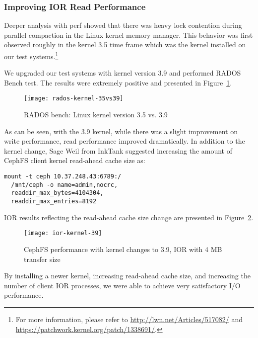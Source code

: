 \subsubsection{Improving IOR Read Performance}

Deeper analysis with perf showed that there was heavy lock contention during
parallel compaction in the Linux kernel memory manager.  This behavior was first
observed roughly in the kernel 3.5 time frame which was the kernel
installed on our test systems.\footnote{For more information,
please refer to \url{http://lwn.net/Articles/517082/} and
\url{https://patchwork.kernel.org/patch/1338691/}.}

We upgraded our test systems with kernel version 3.9 and performed RADOS Bench
test.  The results were extremely positive and presented in
Figure~\ref{fig:rados-kernel}.


\begin{figure}[htb]
\centering
\texttt{[image: rados-kernel-35vs39]}
\caption{RADOS bench: Linux kernel version 3.5 vs. 3.9}
\label{fig:rados-kernel}
\end{figure}



As can be seen, with the 3.9 kernel, while there was a slight improvement on
write performance, read performance improved dramatically.  In addition to the
kernel change, Sage Weil from InkTank suggested increasing the amount of CephFS
client kernel read-ahead cache size as:

\begin{Verbatim}[samepage=true, fontsize=\small]
mount -t ceph 10.37.248.43:6789:/ 
  /mnt/ceph -o name=admin,nocrc,
  readdir_max_bytes=4104304,
  readdir_max_entries=8192
\end{Verbatim}


IOR results reflecting the read-ahead cache size change are presented in
Figure~\ref{fig:ior-kernel-39}.

\begin{figure}[htb]
\centering
\texttt{[image: ior-kernel-39]}
\caption{CephFS performance with kernel changes to 3.9, IOR with 4 MB transfer
size}
\label{fig:ior-kernel-39}
\end{figure}


By installing a newer kernel, increasing read-ahead cache size, and increasing the number of
client IOR processes, we were able to achieve very satisfactory I/O performance.



